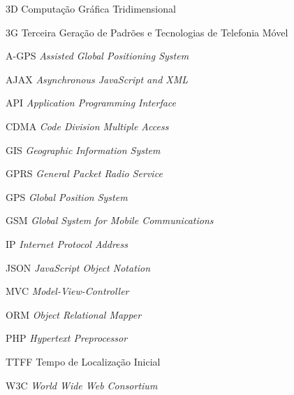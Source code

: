 
\begin{siglas}
    \item[3D] Computação Gráfica Tridimensional
    \item[3G] Terceira Geração de Padrões e Tecnologias de Telefonia Móvel
    \item[A-GPS] \textit{Assisted Global Positioning System}
    \item[AJAX] \textit{Asynchronous JavaScript and XML}
    \item[API] \textit{Application Programming Interface}
    \item[CDMA] \textit{Code Division Multiple Access}
    \item[GIS] \textit{Geographic Information System}
    \item[GPRS] \textit{General Packet Radio Service}
    \item[GPS] \textit{Global Position System}
    \item[GSM] \textit{Global System for Mobile Communications}
    \item[IP] \textit{Internet Protocol Address}
    \item[JSON] \textit{JavaScript Object Notation}
    \item[MVC] \textit{Model-View-Controller}
    \item[ORM] \textit{Object Relational Mapper}
    \item[PHP] \textit{Hypertext Preprocessor}
    \item[TTFF] Tempo de Localização Inicial
    \item[W3C] \textit{World Wide Web Consortium}
    
\end{siglas}

